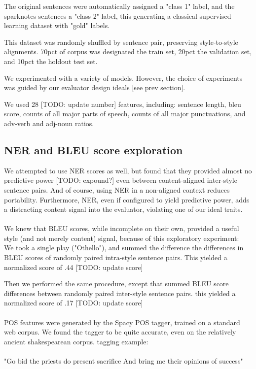 \documentclass[letterpaper, 10 pt, conference]{ieeeconf}  %
\begin{document}
The original sentences were automatically assigned a "class 1" label, and the sparknotes sentences a "class 2" label, this generating a classical supervised learning dataset with "gold" labels.

This dataset was randomly shuffled by sentence pair, preserving style-to-style alignments. 70pct of corpus was designated the train set, 20pct the validation set, and 10pct the holdout test set.
 
We experimented with a variety of models. However, the choice of experiments was guided by our evaluator design ideals [see prev section].

We used 28 [TODO: update number] features, including:
sentence length, bleu score, counts of all major parts of speech, counts of all major punctuations, and adv-verb and adj-noun ratios. 

\subsection{NER and BLEU score exploration}
We attempted to use NER scores as well, but found that they provided almost no predictive power [TODO: expound?] even between content-aligned inter-style sentence pairs. And of course, using NER in a non-aligned context reduces portability. Furthermore, NER, even if configured to yield predictive power, adds a distracting content signal into the evaluator, violating one of our ideal traits.
\\ \\
We knew that BLEU scores, while incomplete on their own, provided a useful style (and not merely content) signal, because of this exploratory experiment:
\\
We took a single play ("Othello"), and summed the difference the differences in BLEU scores of randomly paired intra-style sentence pairs. This yielded a normalized score of .44 [TODO: update score]

Then we performed the same procedure, except that summed BLEU score differences between randomly paired inter-style sentence pairs. this yielded a normalized score of .17 [TODO: update score]
\\
\\
POS features were generated by the Spacy POS tagger, trained on a standard web corpus. We found the tagger to be quite accurate, even on the relatively ancient shakespearean corpus. tagging example:\\
\\
"Go bid the priests do present sacrifice And bring me their opinions of success"\\
\end{document}
